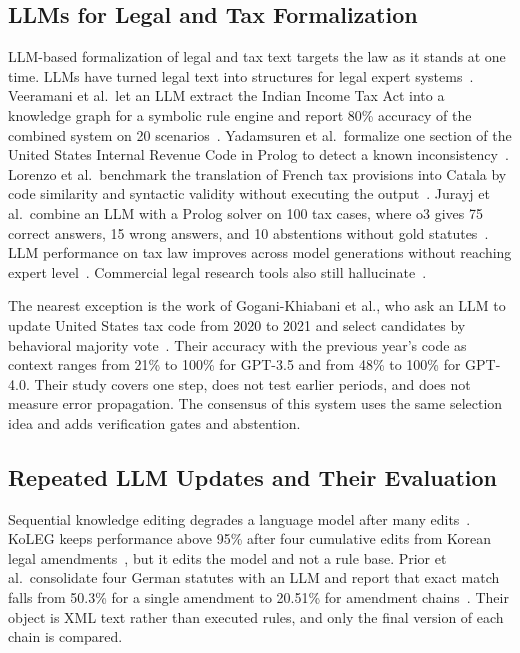 \subsection{LLMs for Legal and Tax Formalization}
LLM-based formalization of legal and tax text targets the law as it stands at one time. LLMs have turned legal text into structures for legal expert systems~\cite{janatian2023texttostructure}. Veeramani et al.\ let an LLM extract the Indian Income Tax Act into a knowledge graph for a symbolic rule engine and report 80\% accuracy of the combined system on 20 scenarios~\cite{veeramani2026neurosymbolic}. Yadamsuren et al.\ formalize one section of the United States Internal Revenue Code in Prolog to detect a known inconsistency~\cite{yadamsuren2026formalization}. Lorenzo et al.\ benchmark the translation of French tax provisions into Catala by code similarity and syntactic validity without executing the output~\cite{lorenzo2025translating}. Jurayj et al.\ combine an LLM with a Prolog solver on 100 tax cases, where o3 gives 75 correct answers, 15 wrong answers, and 10 abstentions without gold statutes~\cite{jurayj2026tax}. LLM performance on tax law improves across model generations without reaching expert level~\cite{blairstanek2023gpt3,nay2024taxattorneys}. Commercial legal research tools also still hallucinate~\cite{magesh2025hallucination}.

The nearest exception is the work of Gogani-Khiabani et al., who ask an LLM to update United States tax code from 2020 to 2021 and select candidates by behavioral majority vote~\cite{goganikhiabani2025maintaining}. Their accuracy with the previous year's code as context ranges from 21\% to 100\% for GPT-3.5 and from 48\% to 100\% for GPT-4.0. Their study covers one step, does not test earlier periods, and does not measure error propagation. The consensus of this system uses the same selection idea and adds verification gates and abstention.

\subsection{Repeated LLM Updates and Their Evaluation}
Sequential knowledge editing degrades a language model after many edits~\cite{gupta2024editing}. KoLEG keeps performance above 95\% after four cumulative edits from Korean legal amendments~\cite{seo2025koleg}, but it edits the model and not a rule base. Prior et al.\ consolidate four German statutes with an LLM and report that exact match falls from 50.3\% for a single amendment to 20.51\% for amendment chains~\cite{prior2025risks}. Their object is XML text rather than executed rules, and only the final version of each chain is compared.

